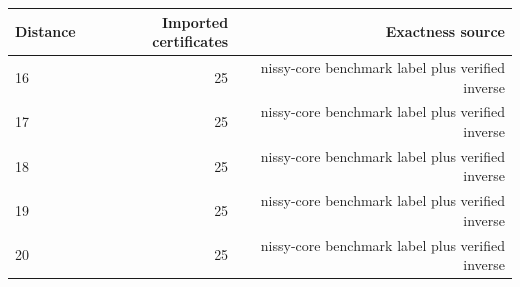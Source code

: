 {\small
\begin{tabular}{lrr}
\hline
Distance & Imported certificates & Exactness source \\
\hline
16 & 25 & nissy-core benchmark label plus verified inverse \\
17 & 25 & nissy-core benchmark label plus verified inverse \\
18 & 25 & nissy-core benchmark label plus verified inverse \\
19 & 25 & nissy-core benchmark label plus verified inverse \\
20 & 25 & nissy-core benchmark label plus verified inverse \\
\hline
\end{tabular}
}
